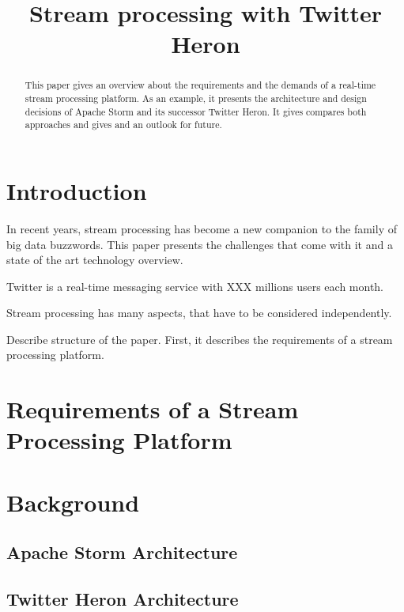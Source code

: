 \documentclass[conference]{IEEEtran}
\begin{document}
\title{Stream processing with Twitter Heron}

\author{
}

\maketitle

\begin{abstract}
This paper gives an overview about the requirements and the demands of a real-time stream processing platform.
As an example, it presents the architecture and design decisions of Apache Storm and its successor Twitter Heron.
It gives compares both approaches and gives and an outlook for future.

\end{abstract}

\section{Introduction}

In recent years, stream processing has become a new companion to the family of big data buzzwords.
This paper presents the challenges that come with it and a state of the art technology overview.

Twitter is a real-time messaging service with XXX millions users each month.

Stream processing has many aspects, that have to be considered independently.

Describe structure of the paper.
First, it describes the requirements of a stream processing platform.

\section{Requirements of a Stream Processing Platform}

\section{Background}
\subsection{Apache Storm Architecture}
\subsection{Twitter Heron Architecture}
\end{document}

